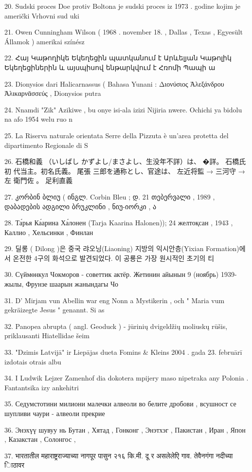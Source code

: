 20. Sudski proces Doe protiv Boltona je sudski proces iz 1973 . godine kojim je američki
Vrhovni sud uki

21. Owen Cunningham Wilson ( 1968 . november 18. , Dallas , Texas , Egyesült Államok )
amerikai színész

22. Հայ Կաթողիկե Եկեղեցին պատկանում է Արևելյան Կաթոլիկ Եկեղեցիներին և
այսպիսով ենթարկվում է Հռոմի Պապի ա

23. Dionysios dari Halicarnassus ( Bahasa Yunani : Διονύσιος Ἀλεξάνδρου Ἀλικαρνᾱσσεύς
, Dionysios putra

24. Nnamdi "Zik" Azikiwe , bu onye isi-ala izizi Nijiria nwere. Ochichi ya bidolu na afo
1954 welu ruo n

25. La Riserva naturale orientata Serre della Pizzuta è un'area protetta del dipartimento
Regionale di S

26. 石橋和義 （いしばし かずよし/まさよし、生没年不詳）は、 �詳。 石橋氏 初
代当主。初名氏義。 尾張 三郎を通称とし、官途は、 左近将監 → 三河守 → 左
衛門佐 。 足利直義

27. კორბინ ბლიუ ( ინგლ. Corbin Bleu ; დ. 21 თებერვალი , 1989 , დაბადების
ადგილი ბრუკლინი , ნიუ-იორკი , ა

28. Та́рья Ка́арина Ха́лонен (Tarja Kaarina Halonen)); 24 желтоқсан , 1943 , Каллио ,
Хельсинки , Финлан

29. 딜롱 ( Dilong )은 중국 랴오닝(Liaoning) 지방의 익시안층(Yixian Formation)에서
온전한 4구의 화석으로 발견되었다. 이 공룡은 가장 원시적인 초기의 티

30. Сүймөнкул Чокморов - советтик актёр. Жетинин айынын 9 (ноябрь) 1939-жылы,
Фрунзе шаарын жанындагы Чо

31. D' Mirjam vun Abellin war eng Nonn a Mystikerin , och " Maria vum gekräizegte Jesus
" genannt. Si as

32. Panopea abrupta ( angl. Geoduck ) - jūrinių dvigeldžių moliuskų rūšis, priklausanti
Hiatellidae šeim

33. "Dzimis Latvijā" ir Liepājas dueta Fomins & Kleins 2004 . gada 23. februārī izdotais
otrais albu

34. I Ludwik Lejzer Zamenhof dia dokotera mpijery maso nipetraka any Polonia .
Fantantsika izy ankehitri

35. Седумстотини милиони малечки алвеоли во белите дробови , всушност се
шупливи чаури - алвеоли прекрие

36. Энэхүү шувуу нь Бутан , Хятад , Гонконг , Энэтхэг , Пакистан , Иран , Япон ,
Казакстан , Солонгос ,

37. भारतातील महाराष्ट्रराज्याच्या नागपूर पासुन २१६ कि.मी. दू र असलेलेएि गाव. तेवैनगंगा
नदीच्या िाठावर

